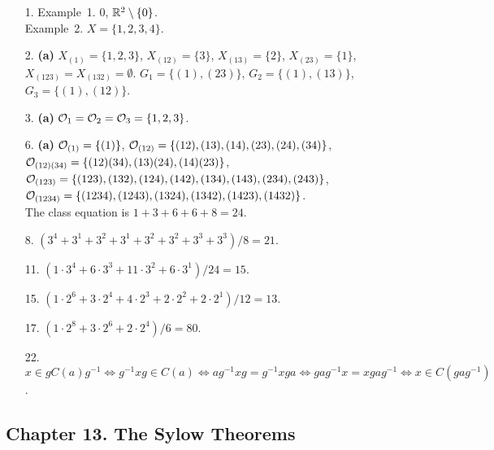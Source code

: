 {\small
\begin{itemize}
 
\bf\item[1.]\rm 
Example~1. $0$, ${\Bbb R}^2 \setminus \{ 0 \}$. \\
Example~2. $X = \{ 1, 2, 3, 4 \}$.
 
\bf\item[2.]\rm
{\bf (a)} $X_{(1)} = \{1, 2, 3  \}$, $X_{(12)} = \{3 \}$, $X_{(13)}=
\{ 2 \}$, $X_{(23)} = \{1 \}$, $X_{(123)} = X_{(132)} = \emptyset$.
$G_1 = \{ (1), (23) \}$, $G_2 = \{(1), (13) \}$, $G_3 = \{ (1),
(12)\}$.
 
\bf\item[3.]\rm
{\bf (a)} 
${\cal O}_1 = {\cal O}_2 = {\cal O}_3 = \{ 1, 2, 3\}$.
 
 
\bf\item[6.]\rm
{\bf (a)}
${\cal O}_{(1)} = \{ (1) \}$, 
${\cal O}_{(12)} = \{ (12), (13), (14), (23), (24), (34) \}$, \\
${\cal O}_{(12)(34)} = \{ (12)(34), (13)(24), (14)(23) \}$, \\
${\cal O}_{(123)} = \{ (123), (132), (124), (142), (134), (143),
(234), (243) \}$,  \\
${\cal O}_{(1234)} = \{ (1234), (1243), (1324), (1342), (1423), (1432)
\}$. \\
The class equation is $1 + 3 + 6 + 6 + 8 = 24$.
 
\bf\item[8.]\rm
$(3^4 + 3^1 + 3^2 + 3^1 + 3^2 + 3^2 + 3^3 + 3^3)/8 = 21$.
 
\bf\item[11.]\rm
$(1 \cdot 3^4 + 6 \cdot 3^3 + 11 \cdot 3^2 + 6 \cdot 3^1)/24 = 15$.
 
\bf\item[15.]\rm
$(1 \cdot 2^6 + 3 \cdot 2^4 + 4 \cdot 2^3 + 2 \cdot 2^2 
+ 2 \cdot 2^1)/12 = 13$.
 
\bf\item[17.]\rm
$(1 \cdot 2^8 + 3 \cdot 2^6 + 2 \cdot 2^4)/6 = 80$.
 
 
\bf\item[22.]\rm
$x \in g C(a) g^{-1} \Leftrightarrow g^{-1}x g \in C(a) \Leftrightarrow
a g^{-1} x g = g^{-1} x g a \Leftrightarrow g a g^{-1} x = x g a
g^{-1} \Leftrightarrow x \in C(gag^{-1})$. 
 
\end{itemize}
}
 
\subsection*{Chapter 13. The Sylow Theorems}
 
